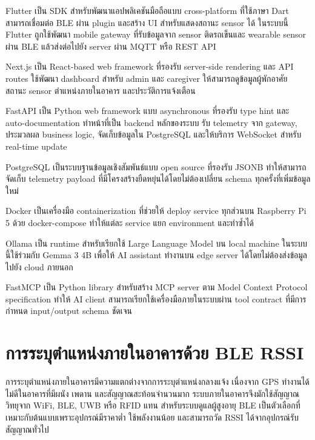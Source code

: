 Flutter เป็น SDK สำหรับพัฒนาแอปพลิเคชันมือถือแบบ cross-platform ที่ใช้ภาษา Dart สามารถเชื่อมต่อ BLE ผ่าน plugin และสร้าง UI สำหรับแสดงสถานะ sensor ได้ ในระบบนี้ Flutter ถูกใช้พัฒนา mobile gateway ที่รับข้อมูลจาก sensor ติดรถเข็นและ wearable sensor ผ่าน BLE แล้วส่งต่อไปยัง server ผ่าน MQTT หรือ REST API \cite{FlutterDocs}

Next.js เป็น React-based web framework ที่รองรับ server-side rendering และ API routes ใช้พัฒนา dashboard สำหรับ admin และ caregiver ให้สามารถดูข้อมูลผู้พักอาศัย สถานะ sensor ตำแหน่งภายในอาคาร และประวัติการแจ้งเตือน \cite{NextJS2024}

FastAPI เป็น Python web framework แบบ asynchronous ที่รองรับ type hint และ auto-documentation ทำหน้าที่เป็น backend หลักของระบบ รับ telemetry จาก gateway, ประมวลผล business logic, จัดเก็บข้อมูลใน PostgreSQL และให้บริการ WebSocket สำหรับ real-time update \cite{FastAPI2024}

PostgreSQL เป็นระบบฐานข้อมูลเชิงสัมพันธ์แบบ open source ที่รองรับ JSONB ทำให้สามารถจัดเก็บ telemetry payload ที่มีโครงสร้างยืดหยุ่นได้โดยไม่ต้องเปลี่ยน schema ทุกครั้งที่เพิ่มข้อมูลใหม่ \cite{PostgreSQL2024}

Docker เป็นเครื่องมือ containerization ที่ช่วยให้ deploy service ทุกส่วนบน Raspberry Pi 5 ด้วย docker-compose ทำให้แต่ละ service แยก environment และทำซ้ำได้ \cite{DockerCompose2024}

Ollama เป็น runtime สำหรับเรียกใช้ Large Language Model บน local machine ในระบบนี้ใช้ร่วมกับ Gemma 3 4B เพื่อให้ AI assistant ทำงานบน edge server ได้โดยไม่ต้องส่งข้อมูลไปยัง cloud ภายนอก \cite{Ollama2024}

FastMCP เป็น Python library สำหรับสร้าง MCP server ตาม Model Context Protocol specification ทำให้ AI client สามารถเรียกใช้เครื่องมือภายในระบบผ่าน tool contract ที่มีการกำหนด input/output schema ชัดเจน \cite{ModelContextProtocol}

\FloatBarrier

\section{การระบุตำแหน่งภายในอาคารด้วย BLE RSSI}
\label{sec:ch2_ble_rssi_localization}

การระบุตำแหน่งภายในอาคารมีความแตกต่างจากการระบุตำแหน่งกลางแจ้ง เนื่องจาก GPS ทำงานได้ไม่ดีในอาคารที่มีผนัง เพดาน และสัญญาณสะท้อนจำนวนมาก ระบบภายในอาคารจึงมักใช้สัญญาณวิทยุจาก WiFi, BLE, UWB หรือ RFID แทน สำหรับระบบดูแลผู้สูงอายุ BLE เป็นตัวเลือกที่เหมาะกับต้นแบบเพราะอุปกรณ์มีราคาต่ำ ใช้พลังงานน้อย และสามารถวัด RSSI ได้จากอุปกรณ์รับสัญญาณทั่วไป

